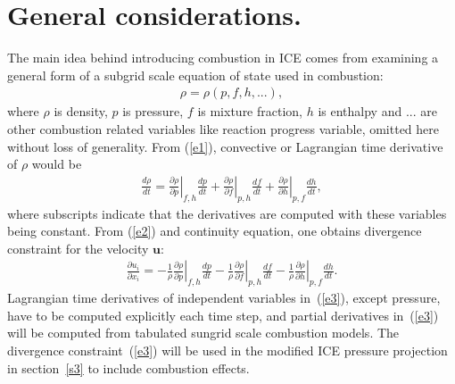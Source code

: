 \documentclass[fleqn,reqno]{amsart}
\newcommand{\pdd}[2]{\frac{\partial{#1}}{\partial{#2}}}
\newcommand{\ldd}[2]{\frac{d{#1}}{d{#2}}}
\begin{document}
\section{General considerations.}
\label{s1}
The main idea behind introducing combustion in ICE comes from examining
a general form of a subgrid scale equation of state used in combustion:
\begin{align}
\label{e1}
\rho=\rho(p,f,h,...),
\end{align}
where $\rho$ is density, $p$ is pressure, $f$ is mixture fraction,
$h$ is enthalpy and $...$ are other combustion related variables like
reaction progress variable, omitted here without loss of generality.
From (\ref{e1}), convective or Lagrangian time derivative of $\rho$
would be
\begin{align}
\label{e2}
\ldd{\rho}{t}=\left.\pdd{\rho}{p}\right|_{f,h}\ldd{p}{t}+
\left.\pdd{\rho}{f}\right|_{p,h}\ldd{f}{t}+
\left.\pdd{\rho}{h}\right|_{p,f}\ldd{h}{t},
\end{align}
where subscripts indicate that the derivatives are computed
with these variables being constant.
From (\ref{e2}) and continuity equation, one obtains divergence
constraint for the velocity $\boldsymbol{u}$:
\begin{align}
\label{e3}
\pdd{u_i}{x_i}=-\frac{1}{\rho}\left.\pdd{\rho}{p}\right|_{f,h}\ldd{p}{t}-
\frac{1}{\rho}\left.\pdd{\rho}{f}\right|_{p,h}\ldd{f}{t}-
\frac{1}{\rho}\left.\pdd{\rho}{h}\right|_{p,f}\ldd{h}{t}.
\end{align}
Lagrangian time derivatives of independent variables in~(\ref{e3}), except
pressure,
have to be computed explicitly each time step, and partial derivatives in~(\ref{e3})
will be computed from tabulated sungrid scale combustion models. 
The divergence constraint~(\ref{e3}) will be used in the modified ICE
pressure projection in section~\ref{s3} to include combustion effects.
\end{document}
